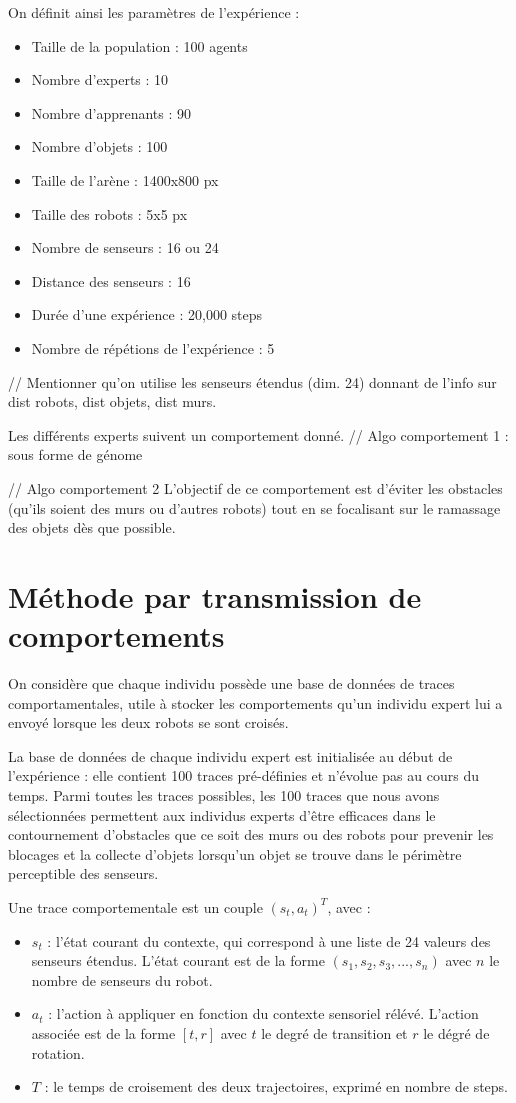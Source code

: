 \documentclass[a4paper, 12pt]{report}
\begin{document}
    On définit ainsi les paramètres de l'expérience :
    \begin{itemize}
    \item Taille de la population : 100 agents
    \item Nombre d'experts : 10
    \item Nombre d'apprenants : 90
    \item Nombre d'objets : 100
    \item Taille de l'arène : 1400x800 px
    \item Taille des robots : 5x5 px
    \item Nombre de senseurs : 16 ou 24
    \item Distance des senseurs : 16
    \item Durée d'une expérience : 20,000 steps
    \item Nombre de répétions de l'expérience : 5
    \end{itemize}
    
// Mentionner qu'on utilise les senseurs étendus (dim. 24) donnant de l'info sur dist robots, dist objets, dist murs.

Les différents experts suivent un comportement donné.
// Algo comportement 1 : sous forme de génome

// Algo comportement 2
L'objectif de ce comportement est d'éviter les obstacles (qu'ils soient des murs ou d'autres robots) tout en se focalisant sur le ramassage des objets dès que possible.


	\section{Méthode par transmission de comportements}
	On considère que chaque individu possède une base de données de traces comportamentales, utile à stocker les comportements qu'un individu expert lui a envoyé lorsque les deux robots se sont croisés.
	
	La base de données de chaque individu expert est initialisée au début de l'expérience : elle contient 100 traces pré-définies et n'évolue pas au cours du temps. Parmi toutes les traces possibles, les 100 traces que nous avons sélectionnées permettent aux individus experts d'être efficaces dans le contournement d'obstacles que ce soit des murs ou des robots pour prevenir les blocages et la collecte d'objets lorsqu'un objet se trouve dans le périmètre perceptible des senseurs.
	
	Une trace comportementale est un couple $( s_t, a_t )^T$, avec :
	\begin{itemize}
	\item $s_t$ : l'état courant du contexte, qui correspond à une liste de 24 valeurs des senseurs étendus. L'état courant est de la forme 
    $(s_1, s_2, s_3, ..., s_n)$ avec $n$ le nombre de senseurs du robot. 
	\item $a_t$ : l'action à appliquer en fonction du contexte sensoriel rélévé. L'action associée est de la forme $[t,r]$ avec $t$ le degré de transition et $r$ le dégré de rotation.
	\item $T$ : le temps de croisement des deux trajectoires, exprimé en nombre de steps. 
	\end{itemize}
\end{document}
